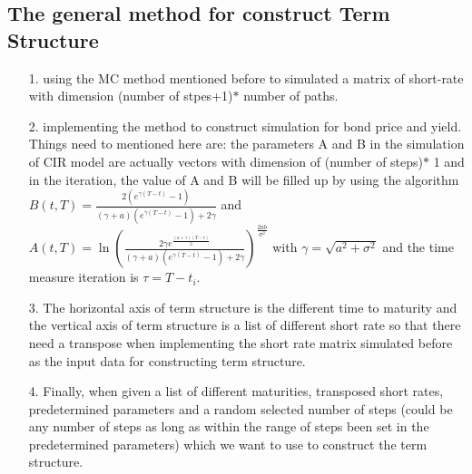 \documentclass[14pt]{extarticle}
\begin{document}
\subsection{The general method for construct Term Structure}
\begin{itemize}
    \item [1.]using the MC method mentioned before to simulated a matrix of short-rate with dimension (number of stpes+1)$\ast$ number of paths.\\
    
    \item[2.]implementing the method to construct simulation for bond price and yield. Things need to mentioned here are: the parameters A and B in the simulation of CIR model are actually vectors with dimension of (number of steps)$\ast$ 1 and in the iteration, the value of A and B will be filled up by using the algorithm $B(t,T)=\frac{ 2(e^{\gamma(T-t)}-1)    } { (\gamma+a)(e^{\gamma(T-t)}-1 ) +2\gamma  } $ and $A(t,T)=\ln({\frac{ 2\gamma e^{\frac{(a+\gamma)(T-t)}{2}} }{(\gamma+a)(e^{\gamma(T-t)}-1 ) +2\gamma    }   } )^{\frac{2ab}{\sigma^2}} $ with $\gamma=\sqrt{a^2+\sigma^2} $ and the time measure iteration is $\tau=T-t_i $.\\
    
    \item[3.]The horizontal axis of term structure is the different time to maturity and the vertical axis of term structure is a list of different short rate so that there need a transpose when implementing the short rate matrix simulated before as the input data for constructing term structure.\\
    
    \item[4.]Finally, when given a list of different maturities, transposed short rates, predetermined parameters and a random selected number of steps (could be any number of steps as long as within the range of steps been set in the predetermined parameters) which we want to use to construct the term structure.
\end{itemize}




\newpage
\end{document}

